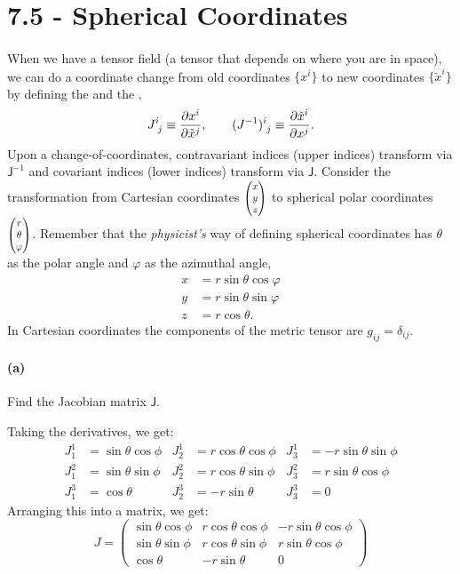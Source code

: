 \documentclass{article}
\begin{document}
\section*{7.5 - Spherical Coordinates}

\paragraph{}
When we have a tensor field (a tensor that depends on where you are in space), we can do a coordinate change from old coordinates $\{x^{i}\}$ to new
coordinates $\{\tilde{x}^{i}\}$ by defining the  and the ,
	\begin{equation*}
		J^{i}_{\phantom{i}j} \equiv \frac{\partial{x^{i}}}{\partial{\tilde{x}^{j}}},	\qquad	(J^{-1})^{i}_{\phantom{i}j} \equiv	\frac{\partial{\tilde{x}^{i}}}{\partial{x^{j}}}.
	\end{equation*}
Upon a change-of-coordinates, {contravariant} indices (upper indices) transform via $\mathsf{J}^{-1}$ and {covariant} indices (lower indices) transform
via $\mathsf{J}$.
Consider the transformation from Cartesian coordinates $\smthreevect{x}{y}{z}$ to spherical polar coordinates $\smthreevect{r}{\theta}{\varphi}$.  Remember that the
\emph{physicist's} way of defining spherical coordinates has $\theta$ as the polar angle and $\varphi$ as the azimuthal angle,
	\begin{align*}
		x &= r\sin\theta\cos\varphi\\
		y &= r\sin\theta\sin\varphi\\
		z &= r\cos\theta.
	\end{align*}
In Cartesian coordinates the components of the metric tensor are $g_{ij} = \delta_{ij}$.

\paragraph{(a)}
Find the Jacobian matrix $\mathsf{J}$.

\begin{solution}
	Taking the derivatives, we get:
	\begin{align*}
		J^1_1 &= \sin \theta \cos \phi & J^1_2 &= r\cos \theta \cos \phi & J^1_3 &= -r \sin \theta \sin \phi\\
		J^2_1 &=  \sin \theta \sin \phi & J^2_2 &= r \cos \theta \sin \phi & J^2_3 &= r \sin \theta \cos \phi\\
		J^3_1 &= \cos \theta & J^3_2 &= -r \sin \theta & J^3_3 &= 0
	\end{align*}
	Arranging this into a matrix, we get:
	\[
		J = \begin{pmatrix} \sin \theta \cos \phi & r \cos \theta \cos \phi & -r \sin \theta \cos \phi\\
		\sin \theta \sin \phi & r \cos \theta \sin \phi & r \sin \theta \cos \phi \\
	\cos \theta & -r \sin \theta & 0\end{pmatrix} 
	\] 
\end{solution}
\phline
\end{document}
